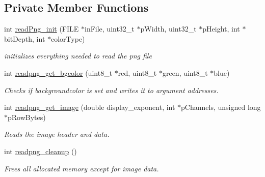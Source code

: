 \subsection*{Private Member Functions}
\begin{DoxyCompactItemize}
\item 
int \mbox{\hyperlink{classPng_a54cee101f15423f12d822cb369bcda42}{read\+Png\+\_\+init}} (F\+I\+LE $\ast$in\+File, uint32\+\_\+t $\ast$p\+Width, uint32\+\_\+t $\ast$p\+Height, int $\ast$bit\+Depth, int $\ast$color\+Type)
\begin{DoxyCompactList}\small\item\em initializes everything needed to read the png file \end{DoxyCompactList}\item 
int \mbox{\hyperlink{classPng_a7cd46afd9214b5cd60e839cc480db9c0}{readpng\+\_\+get\+\_\+bgcolor}} (uint8\+\_\+t $\ast$red, uint8\+\_\+t $\ast$green, uint8\+\_\+t $\ast$blue)
\begin{DoxyCompactList}\small\item\em Checks if backgroundcolor is set and writes it to argument addresses. \end{DoxyCompactList}\item 
int \mbox{\hyperlink{classPng_a2a1a70412369c257a8d56c54753d7d43}{readpng\+\_\+get\+\_\+image}} (double display\+\_\+exponent, int $\ast$p\+Channels, unsigned long $\ast$p\+Row\+Bytes)
\begin{DoxyCompactList}\small\item\em Reads the image header and data. \end{DoxyCompactList}\item 
int \mbox{\hyperlink{classPng_a0988d572e9fd30100d1976f675028fea}{readpng\+\_\+cleanup}} ()
\begin{DoxyCompactList}\small\item\em Frees all allocated memory except for image data. \end{DoxyCompactList}\end{DoxyCompactItemize}
